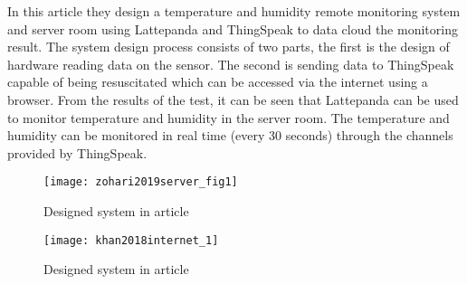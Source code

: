 In this article\cite{nasution2019monitoring} they design a temperature and humidity remote monitoring system and server room using Lattepanda and ThingSpeak to data cloud the monitoring result. The system design process consists of two parts, the first is the design of hardware reading data on the sensor. The second is sending data to ThingSpeak capable of being resuscitated which can be accessed via the internet using a browser. From the results of the test, it can be seen that Lattepanda can be used to monitor temperature and humidity in the server room. The temperature and humidity can be monitored in real time (every 30 seconds) through the channels provided by ThingSpeak.\\



\begin{figure}
    \centering
    \captionsetup{type=figure}
    \texttt{[image: zohari2019server\_fig1]}
    \caption{Designed system in article\cite{zohari2019server}}
    \label{fig:zohari2019server}
\end{figure}
\begin{figure}
    \centering
    \captionsetup{type=figure}
    \texttt{[image: khan2018internet\_1]}
    \caption{Designed system in article\cite{khan2018internet}}
    \label{fig:khan2018internet_1}
\end{figure}

